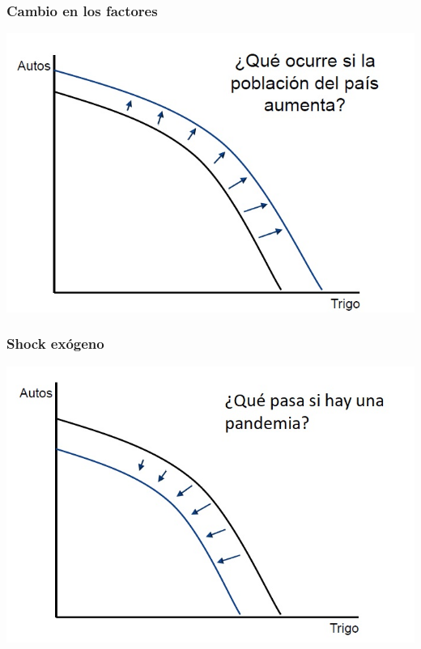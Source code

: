 \documentclass{beamer}
\begin{document}
\begin{frame}
\frametitle{Cambio en los factores}
\begin{center}
    \includegraphics[scale=0.55]{Tema_11.8_cambioenlosfactores.jpg}
\end{center}
\end{frame}

\begin{frame}
\frametitle{ Shock exógeno}
\begin{center}
    \includegraphics[scale=0.6]{Tema_11.9_pandemia.jpg}
\end{center}
\end{frame}
\end{document}
